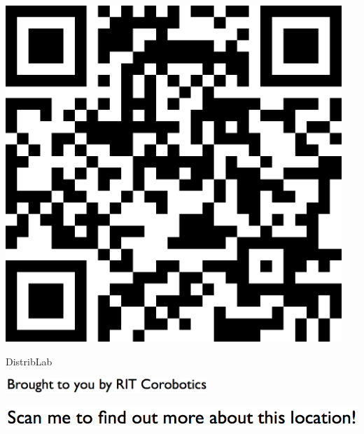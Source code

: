 \documentclass[letterpaper]{article}
\begin{document}
 \begingroup 
 \centerline{\includegraphics[scale=1,width=5in,height=5in]{DistribLab.png}} 
 \endgroup 
 \vspace*{\fill} 

 \hfill{\small DistribLab} 

  \vspace{0.7in} 
 
 \centerline{\includegraphics[scale=1,width=3in]{text-bottom.png}} 
 
 \pagebreak 
{} 
 \vspace*{\fill} 
 
  \centerline{\includegraphics[scale=1,width=6in]{text-top.png}} 
 
 \vspace{0.5in} 
 
\end{document}
